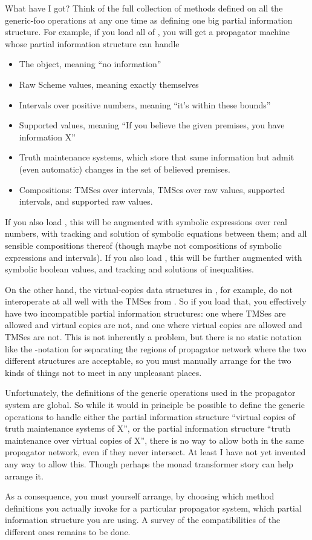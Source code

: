 \documentclass[12pt,letterpaper]{article}
\begin{document}
What have I got?  Think of the full collection of methods defined on
all the generic-foo operations at any one time as defining one big
partial information structure.  For example, if you load all of
, you will get a propagator machine whose partial information
structure can handle
\begin{itemize}
\item The  object, meaning ``no information''
\item Raw Scheme values, meaning exactly themselves
\item Intervals over positive numbers, meaning ``it's within these bounds''
\item Supported values, meaning ``If you believe the given premises, you have information X''
\item Truth maintenance systems, which store that same information but
  admit (even automatic) changes in the set of believed premises.
\item Compositions: TMSes over intervals, TMSes over raw values,
  supported intervals, and supported raw values.
\end{itemize}
If you also load , this will be augmented
with symbolic expressions over real numbers, with tracking and
solution of symbolic equations between them; and all sensible
compositions thereof (though maybe not compositions of symbolic
expressions and intervals).  If you also load
, this will be further augmented with
symbolic boolean values, and tracking and solutions of inequalities.

On the other hand, the virtual-copies data structures in
, for example, do not interoperate at
all well with the TMSes from .  So if you load that, you
effectively have two incompatible partial information structures: one
where TMSes are allowed and virtual copies are not, and one where
virtual copies are allowed and TMSes are not.  This is not inherently
a problem, but there is no static notation like the -notation
for separating the regions of propagator network where the two
different structures are acceptable, so you must manually arrange for
the two kinds of things not to meet in any unpleasant places.

Unfortunately, the definitions of the generic operations used in the
propagator system are global.  So while it would in principle be
possible to define the generic operations to handle either the partial
information structure ``virtual copies of truth maintenance systems of
X'', or the partial information structure ``truth maintenance over
virtual copies of X'', there is no way to allow both in the same
propagator network, even if they never intersect.  At least I have not
yet invented any way to allow this.  Though perhaps the monad
transformer story can help arrange it.

As a consequence, you must yourself arrange, by choosing which method
definitions you actually invoke for a particular propagator system,
which partial information structure you are using.  A survey of the
compatibilities of the different ones remains to be done.
\end{document}
